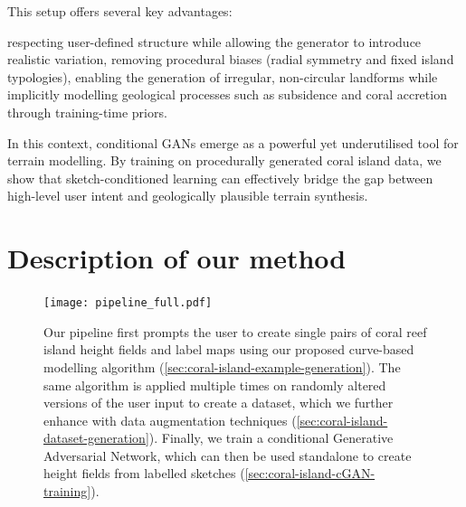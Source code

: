 This setup offers several key advantages: 
\begin{Itemize}
    \Item{} respecting user-defined structure while allowing the generator to introduce realistic variation,
    \Item{} removing procedural biases (radial symmetry and fixed island typologies),
    \Item{} enabling the generation of irregular, non-circular landforms while implicitly modelling geological processes such as subsidence and coral accretion through training-time priors.
\end{Itemize}

In this context, conditional GANs emerge as a powerful yet underutilised tool for terrain modelling. By training on procedurally generated coral island data, we show that sketch-conditioned learning can effectively bridge the gap between high-level user intent and geologically plausible terrain synthesis.




\section{Description of our method}
\label{sec:coral-island-method-description}

\begin{figure}[H]
    \texttt{[image: pipeline\_full.pdf]}
    \caption{Our pipeline first prompts the user to create single pairs of coral reef island height fields and label maps using our proposed curve-based modelling algorithm (\cref{sec:coral-island-example-generation}). The same algorithm is applied multiple times on randomly altered versions of the user input to create a dataset, which we further enhance with data augmentation techniques (\cref{sec:coral-island-dataset-generation}). Finally, we train a conditional Generative Adversarial Network, which can then be used standalone to create height fields from labelled sketches (\cref{sec:coral-island-cGAN-training}).}
    \label{fig:coral-island-pipeline}
\end{figure}




